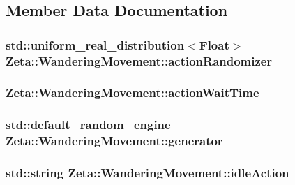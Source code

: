 \subsection{Member Data Documentation}
\hypertarget{classZeta_1_1WanderingMovement_af47c068896582706813ad211bfc38a6b}{
\subsubsection[{action\+Randomizer}]{\setlength{\rightskip}{0pt plus 5cm}std\+::uniform\+\_\+real\+\_\+distribution$<${\bf Float}$>$ Zeta\+::\+Wandering\+Movement\+::action\+Randomizer\hspace{0.3cm}{\ttfamily [private]}}}\label{classZeta_1_1WanderingMovement_af47c068896582706813ad211bfc38a6b}
\hypertarget{classZeta_1_1WanderingMovement_a81546d4e7aa3167f9d29070632e484cd}{
\subsubsection[{action\+Wait\+Time}]{ Zeta\+::\+Wandering\+Movement\+::action\+Wait\+Time\hspace{0.3cm}{\ttfamily [private]}}}\label{classZeta_1_1WanderingMovement_a81546d4e7aa3167f9d29070632e484cd}
\hypertarget{classZeta_1_1WanderingMovement_a75080229ace2e55afe18ef6f4467423a}{
\subsubsection[{generator}]{\setlength{\rightskip}{0pt plus 5cm}std\+::default\+\_\+random\+\_\+engine Zeta\+::\+Wandering\+Movement\+::generator\hspace{0.3cm}{\ttfamily [private]}}}\label{classZeta_1_1WanderingMovement_a75080229ace2e55afe18ef6f4467423a}
\hypertarget{classZeta_1_1WanderingMovement_a210f9adaeff521f33dd201fcaf741586}{
\subsubsection[{idle\+Action}]{\setlength{\rightskip}{0pt plus 5cm}std\+::string Zeta\+::\+Wandering\+Movement\+::idle\+Action\hspace{0.3cm}{\ttfamily [private]}}}\label{classZeta_1_1WanderingMovement_a210f9adaeff521f33dd201fcaf741586}
